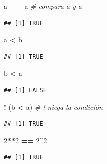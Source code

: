 \documentclass[]{book}
\newenvironment{Shaded}{\begin{snugshade}}{\end{snugshade}}
\newcommand{\DecValTok}[1]{\textcolor[rgb]{0.00,0.00,0.81}{#1}}
\newcommand{\StringTok}[1]{\textcolor[rgb]{0.31,0.60,0.02}{#1}}
\newcommand{\CommentTok}[1]{\textcolor[rgb]{0.56,0.35,0.01}{\textit{#1}}}
\newcommand{\OperatorTok}[1]{\textcolor[rgb]{0.81,0.36,0.00}{\textbf{#1}}}
\newcommand{\NormalTok}[1]{#1}
\begin{document}
\begin{Shaded}
\begin{Highlighting}[]
\NormalTok{a }\OperatorTok{==}\StringTok{ }\NormalTok{a  }\CommentTok{# compara a y a}
\end{Highlighting}
\end{Shaded}

\begin{verbatim}
## [1] TRUE
\end{verbatim}

\begin{Shaded}
\begin{Highlighting}[]
\NormalTok{a }\OperatorTok{<}\StringTok{ }\NormalTok{b}
\end{Highlighting}
\end{Shaded}

\begin{verbatim}
## [1] TRUE
\end{verbatim}

\begin{Shaded}
\begin{Highlighting}[]
\NormalTok{b }\OperatorTok{<}\StringTok{ }\NormalTok{a}
\end{Highlighting}
\end{Shaded}

\begin{verbatim}
## [1] FALSE
\end{verbatim}

\begin{Shaded}
\begin{Highlighting}[]
\OperatorTok{!}\StringTok{ }\NormalTok{(b }\OperatorTok{<}\StringTok{ }\NormalTok{a) }\CommentTok{# ! niega la condición}
\end{Highlighting}
\end{Shaded}

\begin{verbatim}
## [1] TRUE
\end{verbatim}

\begin{Shaded}
\begin{Highlighting}[]
\DecValTok{2}\OperatorTok{**}\DecValTok{2} \OperatorTok{==}\StringTok{ }\DecValTok{2}\OperatorTok{^}\DecValTok{2}
\end{Highlighting}
\end{Shaded}

\begin{verbatim}
## [1] TRUE
\end{verbatim}
\end{document}
